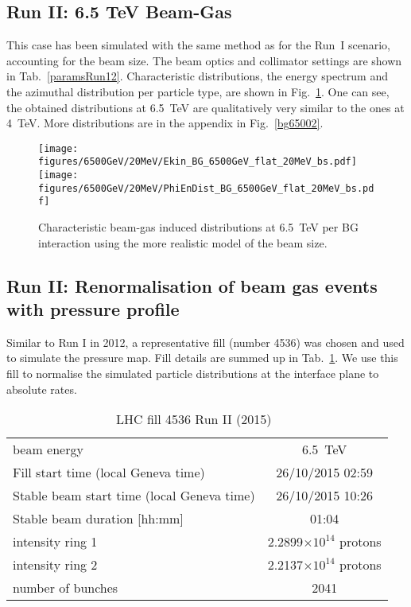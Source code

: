 \subsection{Run II: 6.5 TeV Beam-Gas}

This case has been simulated with the same method as for the Run~I scenario, accounting for the beam size. The beam optics and collimator settings are shown in Tab.~\ref{paramsRun12}. Characteristic distributions, the energy spectrum and the azimuthal distribution per particle type, are shown in Fig.~\ref{bg6500}. One can see, the obtained distributions at 6.5~TeV are qualitatively very similar to the ones at 4~TeV. More distributions are in the appendix in Fig.~\ref{bg65002}. 

\begin{figure}%
\begin{center}
  \texttt{[image: figures/6500GeV/20MeV/Ekin\_BG\_6500GeV\_flat\_20MeV\_bs.pdf]}
  \texttt{[image: figures/6500GeV/20MeV/PhiEnDist\_BG\_6500GeV\_flat\_20MeV\_bs.pdf]}
\end{center}
\vspace{-0.6cm}
 \caption{Characteristic beam-gas induced distributions at 6.5~TeV per BG interaction using the more realistic model of the beam size.
  \label{bg6500}}
\end{figure}

\subsection{Run II: Renormalisation of beam gas events with pressure profile}

Similar to Run I in 2012, a representative fill (number 4536) was chosen and used to simulate the pressure map. Fill details are summed up in Tab.~\ref{tab:fillRunII}. We use this fill to normalise the simulated particle distributions at the interface plane to absolute rates. 

\begin{table}
   \centering
   \caption{LHC fill 4536 Run II (2015)~\cite{refAccStats}}
   \begin{tabular}{l||c}
       \hline
       beam energy  & 6.5~TeV \\
       Fill start time (local Geneva time) & 26/10/2015 02:59\\
       Stable beam start time (local Geneva time) & 26/10/2015 10:26\\
       Stable beam duration [hh:mm] & 01:04\\
       intensity ring 1& 2.2899$\times 10^{14}$ protons\\
       intensity ring 2& 2.2137$\times 10^{14}$ protons\\
       number of bunches & 2041 \\
       \hline
   \end{tabular}
   \label{tab:fillRunII}
\end{table}

